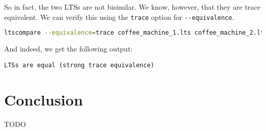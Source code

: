 \documentclass{clseminar}
\begin{document}
  So in fact, the two LTSs are not bisimilar. We know, however, that they are trace equivalent. We can verify this using the \texttt{trace} option for \texttt{-{}-equivalence}.

  \begin{lstlisting}[language=Bash]
ltscompare --equivalence=trace coffee_machine_1.lts coffee_machine_2.lts
  \end{lstlisting}

  And indeed, we get the following output:

  \begin{lstlisting}
LTSs are equal (strong trace equivalence)
  \end{lstlisting}

  \section{Conclusion}

  TODO

  \backmatter

  \printbibliography
\end{document}
